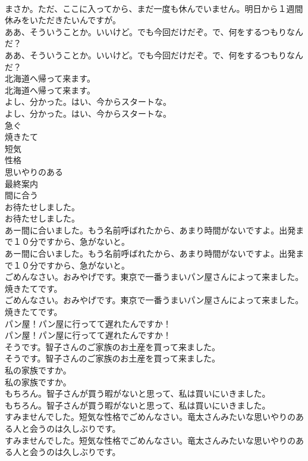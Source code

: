 \documentclass[8pt]{extreport}
\begin{document}
\begin{CJK}{UTF8}{min}
\\	まさか。ただ、ここに入ってから、まだ一度も休んでいません。明日から１週間休みをいただきたいんですが。 
\\	ああ、そういうことか。いいけど。でも今回だけだぞ。で、何をするつもりなんだ？	
\\	ああ、そういうことか。いいけど。でも今回だけだぞ。で、何をするつもりなんだ？ 
\\	北海道へ帰って来ます。	
\\	北海道へ帰って来ます。 
\\	よし、分かった。はい、今からスタートな。	
\\	よし、分かった。はい、今からスタートな。 
\\	急ぐ
\\	焼きたて
\\	短気
\\	性格
\\	思いやりのある
\\	最終案内
\\	間に合う
\\	お待たせしました。	
\\	お待たせしました。 
\\	あー間に合いました。もう名前呼ばれたから、あまり時間がないですよ。出発まで１０分ですから、急がないと。	
\\	あー間に合いました。もう名前呼ばれたから、あまり時間がないですよ。出発まで１０分ですから、急がないと。 
\\	ごめんなさい。おみやげです。東京で一番うまいパン屋さんによって来ました。焼きたてです。	
\\	ごめんなさい。おみやげです。東京で一番うまいパン屋さんによって来ました。焼きたてです。 
\\	パン屋！パン屋に行ってて遅れたんですか！	
\\	パン屋！パン屋に行ってて遅れたんですか！ 
\\	そうです。智子さんのご家族のお土産を買って来ました。	
\\	そうです。智子さんのご家族のお土産を買って来ました。 
\\	私の家族ですか。	
\\	私の家族ですか。 
\\	もちろん。智子さんが買う暇がないと思って、私は買いにいきました。	
\\	もちろん。智子さんが買う暇がないと思って、私は買いにいきました。 
\\	すみませんでした。短気な性格でごめんなさい。竜太さんみたいな思いやりのある人と会うのは久しぶりです。	
\\	すみませんでした。短気な性格でごめんなさい。竜太さんみたいな思いやりのある人と会うのは久しぶりです。 

\end{CJK}
\end{document}

